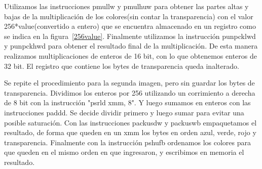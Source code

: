 \documentclass[a4paper]{article}
\begin{document}
Utilizamos las instrucciones pmullw y pmulhuw para obtener las partes altas y bajas de la multiplicación de los colores(sin contar la transparencia) con el valor 256*value(convertido a entero) que se encuentra almacenado en un registro como se indica en la figura~\ref{256value}. Finalmente utilizamos la instrucción punpcklwd y punpckhwd para obtener el resultado final de la multiplicación. De esta manera realizamos multiplicaciones de enteros de 16 bit, con lo que obtenemos enteros de 32 bit. El registro que contiene los bytes de transparencia queda inalterado.

Se repite el procedimiento para la segunda imagen, pero sin guardar los bytes de transparencia. Dividimos los enteros por 256 utilizando un corrimiento a derecha de 8 bit con la instrucción "psrld xmm, 8". Y luego sumamos en enteros con las instrucciones paddd. Se decide dividir primero y luego sumar para evitar una posible saturación. Con las instrucciones packusdw y packuswb empaquetamos el resultado, de forma que queden en un xmm los bytes en orden azul, verde, rojo y transparencia. Finalmente con la instrucción pshufb ordenamos los colores para que queden en el mismo orden en que ingresaron, y escribimos en memoria el resultado.
\end{document}
